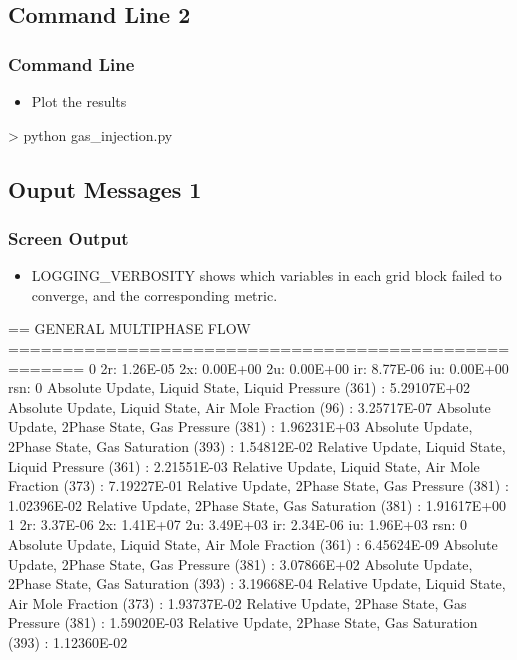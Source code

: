 \documentclass{beamer}
\newcommand\redcomment[1]{{{\color{red} #1}}}
\begin{document}
\subsection{Command Line 2}
\begin{frame}[fragile]\frametitle{Command Line}

\begin{itemize}
  \item Plot the results
\end{itemize}

\begin{semiverbatim}
> python gas_injection.py
\end{semiverbatim}

\end{frame}

\subsection{Ouput Messages 1}

\begin{frame}[fragile]\frametitle{Screen Output}

\begin{itemize}
\item \redcomment{LOGGING\_VERBOSITY} shows which variables in each grid block failed to converge, and the corresponding metric.
\end{itemize}

\begin{semiverbatim}
\tiny
== GENERAL MULTIPHASE FLOW =====================================================
  0 2r: 1.26E-05 2x: 0.00E+00 2u: 0.00E+00 ir: 8.77E-06 iu: 0.00E+00 rsn:   0
   Absolute Update, Liquid State, Liquid Pressure (361) : 5.29107E+02
   Absolute Update, Liquid State, Air Mole Fraction (96) : 3.25717E-07
   Absolute Update, 2Phase State, Gas Pressure (381) : 1.96231E+03
   Absolute Update, 2Phase State, Gas Saturation (393) : 1.54812E-02
   Relative Update, Liquid State, Liquid Pressure (361) : 2.21551E-03
   Relative Update, Liquid State, Air Mole Fraction (373) : 7.19227E-01
   Relative Update, 2Phase State, Gas Pressure (381) : 1.02396E-02
   Relative Update, 2Phase State, Gas Saturation (381) : 1.91617E+00
  1 2r: 3.37E-06 2x: 1.41E+07 2u: 3.49E+03 ir: 2.34E-06 iu: 1.96E+03 rsn:   0
   Absolute Update, Liquid State, Air Mole Fraction (361) : 6.45624E-09
   Absolute Update, 2Phase State, Gas Pressure (381) : 3.07866E+02
   Absolute Update, 2Phase State, Gas Saturation (393) : 3.19668E-04
   Relative Update, Liquid State, Air Mole Fraction (373) : 1.93737E-02
   Relative Update, 2Phase State, Gas Pressure (381) : 1.59020E-03
   Relative Update, 2Phase State, Gas Saturation (393) : 1.12360E-02

\end{semiverbatim}
\end{frame}
\end{document}
